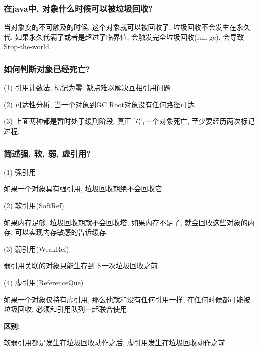 \subsubsection{在java中, 对象什么时候可以被垃圾回收?}
当对象变的不可触及的时候, 这个对象就可以被回收了, 垃圾回收不会发生在永久代, 如果永久代满了或者是超过了临界值, 会触发完全垃圾回收(full gc), 会导致Stop-the-world.
\subsubsection{如何判断对象已经死亡?}
(1) 引用计数法, 标记为零. 缺点难以解决互相引用问题 \par
(2) 可达性分析, 当一个对象到GC Root对象没有任何路径可达. \par
(3) 上面两种都是暂时处于缓刑阶段, 真正宣告一个对象死亡, 至少要经历两次标记过程.
\subsubsection{简述强, 软, 弱, 虚引用?}
(1) 强引用 \par
如果一个对象具有强引用, 垃圾回收期绝不会回收它 \par
(2) 软引用(SoftRef) \par
如果内存足够, 垃圾回收期就不会回收塔, 如果内存不足了, 就会回收这些对象的内存. 可以实现内存敏感的告诉缓存. \par
(3) 弱引用(WeakRef) \par
弱引用关联的对象只能生存到下一次垃圾回收之前. \par
(4) 虚引用(ReferenceQue) \par
如果一个对象仅持有虚引用, 那么他就和没有任何引用一样, 在任何时候都可能被垃圾回收. 必须和引用队列一起联合使用.\par
\textbf{区别:} \par
软弱引用都是发生在垃圾回收动作之后, 虚引用发生在垃圾回收动作之前.